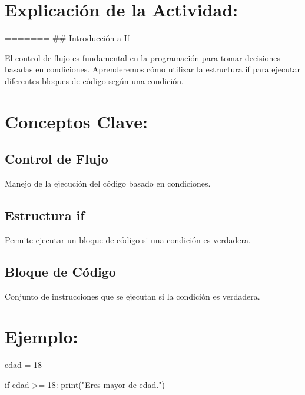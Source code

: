 \documentclass[
  a4paper,
  onepage,
  openany]{scrreprt}
\newenvironment{Shaded}{\begin{snugshade}}{\end{snugshade}}
\newcommand{\BuiltInTok}[1]{\textcolor[rgb]{0.00,0.23,0.31}{#1}}
\newcommand{\ControlFlowTok}[1]{\textcolor[rgb]{0.00,0.23,0.31}{#1}}
\newcommand{\DecValTok}[1]{\textcolor[rgb]{0.68,0.00,0.00}{#1}}
\newcommand{\NormalTok}[1]{\textcolor[rgb]{0.00,0.23,0.31}{#1}}
\newcommand{\OperatorTok}[1]{\textcolor[rgb]{0.37,0.37,0.37}{#1}}
\newcommand{\StringTok}[1]{\textcolor[rgb]{0.13,0.47,0.30}{#1}}
\begin{document}
\hypertarget{explicaciuxf3n-de-la-actividad-26}{%
\section{Explicación de la
Actividad:}\label{explicaciuxf3n-de-la-actividad-26}}

======= \#\# Introducción a If

El control de flujo es fundamental en la programación para tomar
decisiones basadas en condiciones. Aprenderemos cómo utilizar la
estructura if para ejecutar diferentes bloques de código según una
condición.

\hypertarget{conceptos-clave-29}{%
\section{Conceptos Clave:}\label{conceptos-clave-29}}

\hypertarget{control-de-flujo-1}{%
\subsection{Control de Flujo}\label{control-de-flujo-1}}

Manejo de la ejecución del código basado en condiciones.

\hypertarget{estructura-if-1}{%
\subsection{Estructura if}\label{estructura-if-1}}

Permite ejecutar un bloque de código si una condición es verdadera.

\hypertarget{bloque-de-cuxf3digo-1}{%
\subsection{Bloque de Código}\label{bloque-de-cuxf3digo-1}}

Conjunto de instrucciones que se ejecutan si la condición es verdadera.

\hypertarget{ejemplo-29}{%
\section{Ejemplo:}\label{ejemplo-29}}

\begin{Shaded}
\begin{Highlighting}[]
\NormalTok{edad }\OperatorTok{=} \DecValTok{18}

\ControlFlowTok{if}\NormalTok{ edad }\OperatorTok{\textgreater{}=} \DecValTok{18}\NormalTok{:}
    \BuiltInTok{print}\NormalTok{(}\StringTok{"Eres mayor de edad."}\NormalTok{)}
\end{Highlighting}
\end{Shaded}
\end{document}
